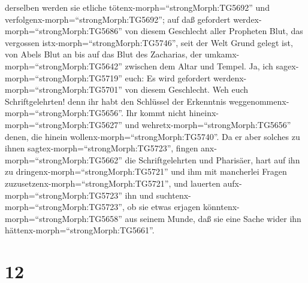 derselben werden sie etliche tötenx-morph=``strongMorph:TG5692'' und
verfolgenx-morph=``strongMorph:TG5692'';  auf daß gefordert
werdex-morph=``strongMorph:TG5686'' von diesem Geschlecht aller
Propheten Blut, das vergossen istx-morph=``strongMorph:TG5746'', seit
der Welt Grund gelegt ist,  von Abels Blut an bis auf das
Blut des Zacharias, der umkamx-morph=``strongMorph:TG5642'' zwischen dem
Altar und Tempel. Ja, ich sagex-morph=``strongMorph:TG5719'' euch: Es
wird gefordert werdenx-morph=``strongMorph:TG5701'' von diesem
Geschlecht.  Weh euch Schriftgelehrten! denn ihr habt den
Schlüssel der Erkenntnis weggenommenx-morph=``strongMorph:TG5656''. Ihr
kommt nicht hineinx-morph=``strongMorph:TG5627'' und
wehretx-morph=``strongMorph:TG5656'' denen, die hinein
wollenx-morph=``strongMorph:TG5740''.  Da er aber solches
zu ihnen sagtex-morph=``strongMorph:TG5723'', fingen
anx-morph=``strongMorph:TG5662'' die Schriftgelehrten und Pharisäer,
hart auf ihn zu dringenx-morph=``strongMorph:TG5721'' und ihm mit
mancherlei Fragen zuzusetzenx-morph=``strongMorph:TG5721'',
 und lauerten aufx-morph=``strongMorph:TG5723'' ihn und
suchtenx-morph=``strongMorph:TG5723'', ob sie etwas erjagen
könntenx-morph=``strongMorph:TG5658'' aus seinem Munde, daß sie eine
Sache wider ihn hättenx-morph=``strongMorph:TG5661''.

\hypertarget{section-11}{%
\section{12}\label{section-11}}

